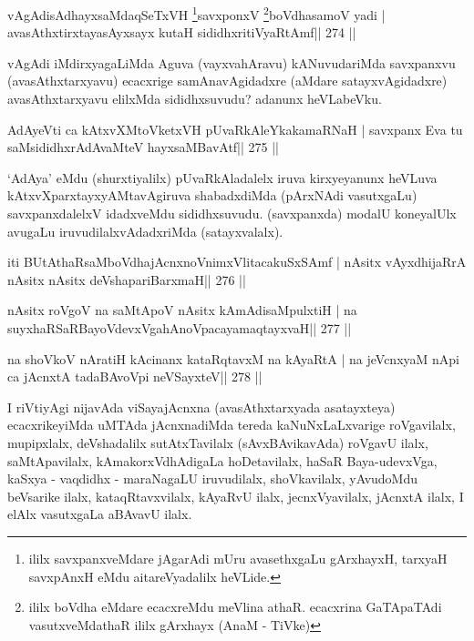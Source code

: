\begin{shl}
vAgAdisAdhayxsaMdaqSeTxVH \footnote{ililx savxpanxveMdare jAgarAdi mUru avasethxgaLu 
gArxhayxH, tarxyaH savxpAnxH eMdu aitareVyadalilx heVLide.}savxponxV \footnote{ililx boVdha eMdare ecacxreMdu meVlina athaR. ecacxrina GaTApaTAdi vasutxveMdathaR ililx gArxhayx (AnaM - TiVke)}boVdhasamoV yadi |
avasAthxtirxtayasAyxsayx kutaH sididhxritiVyaRtAmf\hfill || 274 ||
\end{shl}

\begin{artha}
vAgAdi iMdirxyagaLiMda Aguva (vayxvahAravu) kANuvudariMda savxpanxvu (avasAthxtarxyavu) ecacxrige samAnavAgidadxre (aMdare satayxvAgidadxre) avasAthxtarxyavu elilxMda sididhxsuvudu? adanunx heVLabeVku.
\end{artha}

\begin{shl}
AdAyeVti ca kAtxvXMtoVketxVH pUvaRkAleYkakamaRNaH |
savxpanx Eva tu saMsididhxrAdAvaMteV hayxsaMBavAtf\hfill || 275 ||
\end{shl}

\begin{artha}
`AdAya' eMdu (shurxtiyalilx) pUvaRkAladalelx iruva kirxyeyanunx heVLuva kAtxvXparxtayxyAMtavAgiruva shabadxdiMda (pArxNAdi vasutxgaLu) savxpanxdalelxV idadxveMdu sididhxsuvudu. (savxpanxda) modalU koneyalUlx avugaLu iruvudilalxvAdadxriMda (satayxvalalx).
\end{artha}


\begin{shl}
iti BUtAthaRsaMboVdhajAcnxnoVnimxVlitacakuSxSAmf |
nAsitx vAyxdhijaRrA nAsitx nAsitx deVshapariBarxmaH\hfill || 276 ||
\end{shl}

\begin{shl}
nAsitx roVgoV na saMtApoV nAsitx kAmAdisaMpulxtiH |
na suyxhaRSaRBayoVdevxVgahAnoVpacayamaqtayxvaH\hfill || 277 ||
\end{shl}

\begin{shl}
na shoVkoV nAratiH kAcinanx kataRqtavxM na kAyaRtA |
na jeVcnxyaM nApi ca jAcnxtA tadaBAvoV\s pi neVSayxteV\hfill || 278 ||
\end{shl}

\begin{artha}
I riVtiyAgi nijavAda viSayajAcnxna (avasAthxtarxyada asatayxteya) 
ecacxrikeyiMda uMTAda jAcnxnadiMda tereda kaNuNxLaLxvarige roVgavilalx, mupipxlalx, deVshadalilx sutAtxTavilalx (sAvxBAvikavAda) roVgavU ilalx, saMtApavilalx, kAmakorxVdhAdigaLa hoDetavilalx, haSaR Baya-udevxVga, kaSxya - vaqdidhx - maraNagaLU iruvudilalx, shoVkavilalx, yAvudoMdu beVsarike ilalx, kataqRtavxvilalx, kAyaRvU ilalx, jecnxVyavilalx, jAcnxtA ilalx, I elAlx vasutxgaLa aBAvavU ilalx.
\end{artha}

